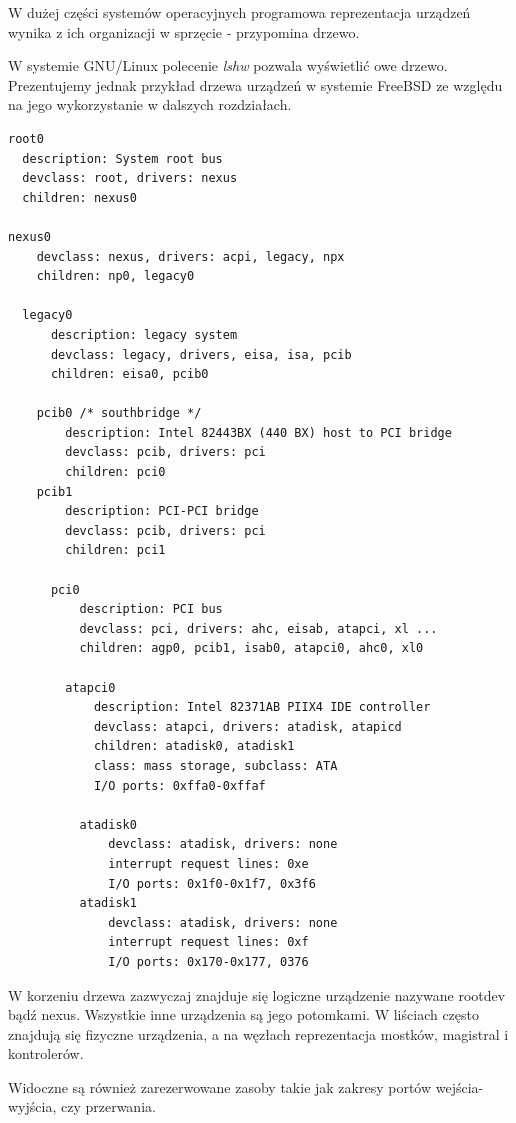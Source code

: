 \documentclass[shortabstract,inz]{iithesis}
\begin{document}
W dużej części systemów operacyjnych programowa reprezentacja urządzeń wynika 
z ich organizacji w sprzęcie - przypomina drzewo.

W systemie GNU/Linux polecenie \textit{lshw} pozwala wyświetlić owe drzewo.
Prezentujemy jednak przykład drzewa urządzeń w systemie FreeBSD ze względu na
jego wykorzystanie w dalszych rozdziałach.

\begin{lstlisting}[caption={Przykładowe drzewo urządzeń w systemie FreeBSD \cite{freebsd_book:tree}}, label={listing:device_tree}]
root0
  description: System root bus
  devclass: root, drivers: nexus
  children: nexus0

nexus0
    devclass: nexus, drivers: acpi, legacy, npx
    children: np0, legacy0

  legacy0
      description: legacy system
      devclass: legacy, drivers, eisa, isa, pcib
      children: eisa0, pcib0

    pcib0 /* southbridge */
        description: Intel 82443BX (440 BX) host to PCI bridge
        devclass: pcib, drivers: pci
        children: pci0
    pcib1
        description: PCI-PCI bridge
        devclass: pcib, drivers: pci
        children: pci1

      pci0
          description: PCI bus
          devclass: pci, drivers: ahc, eisab, atapci, xl ...
          children: agp0, pcib1, isab0, atapci0, ahc0, xl0

        atapci0
            description: Intel 82371AB PIIX4 IDE controller
            devclass: atapci, drivers: atadisk, atapicd
            children: atadisk0, atadisk1
            class: mass storage, subclass: ATA
            I/O ports: 0xffa0-0xffaf

          atadisk0
              devclass: atadisk, drivers: none
              interrupt request lines: 0xe
              I/O ports: 0x1f0-0x1f7, 0x3f6
          atadisk1
              devclass: atadisk, drivers: none
              interrupt request lines: 0xf
              I/O ports: 0x170-0x177, 0376
\end{lstlisting}

W korzeniu drzewa zazwyczaj znajduje się logiczne urządzenie nazywane rootdev bądź nexus.
Wszystkie inne urządzenia są jego potomkami. W liściach często znajdują się
fizyczne urządzenia, a na węzłach reprezentacja mostków, magistral i kontrolerów.

Widoczne są również zarezerwowane zasoby takie jak zakresy portów wejścia-wyjścia, czy przerwania.
\end{document}
